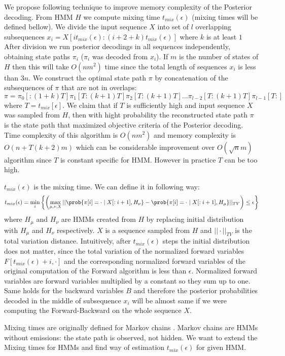 \def\tmix{t_{mix}(\epsilon)}
We propose following technique to improve memory complexity of the
Posterior decoding.  From HMM $H$ we compute mixing time
$t_{mix}(\epsilon)$ (mixing times will be defined bellow).  We divide the input
sequence $X$ into set of $l$ overlapping subsequences
$x_i=X[it_{mix}(\epsilon):(i+2+k)t_{mix}(\epsilon)]$ where $k$ is at least $1$
After division we run posterior decodings in all sequences independently,
obtaining state paths $\pi_i$ ($\pi_i$ was decoded from $x_i$). If $m$ is the
number of states of $H$ then this will take $O(nm^2)$ time since the total
length of sequences $x_i$ is less than $3n$.  We construct the optimal state
path $\pi$ by concatenation of the subsequences of $\pi$ that are not in
overlaps: \[\pi = \pi_0[:(1+k)T] \pi_1[T:(k+1)T] \pi_2[T:(k+1)T] \dots
\pi_{l-2}[T:(k+1)T] \pi_{l-1}[T:]\] where $T=t_{mix}[\epsilon]$. We claim that
if $T$ is sufficiently high and input sequence $X$ was sampled from $H$, then
with hight probability the reconstructed state path $\pi$ is the state path that
maximized objective criteria of the Posterior decoding.  Time complexity of this
algorithm is $O(nm^2)$ and memory complexity is $O(n+T(k+2)m)$ which can be
considerable improvement over $O(\sqrt n m)$ algorithm since $T$ is constant
specific for HMM. However in practice $T$ can be too high.


$\tmix$ is the mixing time. We can define it in following way:
\[\tmix = \min_{i}\left\{ 
\left(\max_{\mu,\nu,X} || \prob{\pi[i] = \cdot\mid X[:i+1],H_\nu} - \prob{\pi[i] = \cdot\mid
X[:i+1],H_\mu}||_{TV}\right)\leq \epsilon
\right\}
\] 
where $H_\mu$ and $H_\nu$ are HMMs created from $H$ by replacing initial
distribution with $H_\mu$ and $H_\nu$ respectively.
$X$ is a sequence
sampled from $H$ and $||\cdot||_{TV}$ is the total variation distance.
Intuitively, after $\tmix$ steps the initial distribution does not matter, since
the total variation of the normalized forward variables $F[\tmix+i,\cdot]$
and the corresponding normalized forward variables of the original computation
of the Forward algorithm is less than $\epsilon$. Normalized forward variables
are forward variables multiplied by a constant so they sum up to one. 
Same holds for the backward
variables $B$ and therefore the posterior probabilities decoded in the middle of
subsequence $x_i$ will be almost same if we were computing the Forward-Backward
on the whole sequence $X$.

Mixing times are originally defined for Markov chains \cite{Levin2006}. Markov
chains are HMMs without emissions: the state path is observed, not hidden. We
want to extend the Mixing times for HMMs and find way of estimation $\tmix$ for
given HMM.

